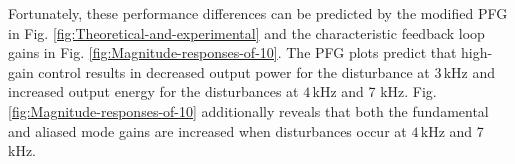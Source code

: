 \documentclass [11pt, proquest] {uwthesis}[2020/02/24]
\begin{document}
Fortunately, these performance differences can be predicted by the
modified PFG in Fig. \ref{fig:Theoretical-and-experimental} and the
characteristic feedback loop gains in Fig. \ref{fig:Magnitude-responses-of-10}.
The PFG plots predict that high-gain control results in decreased
output power for the disturbance at $3\,\text{kHz}$ and increased
output energy for the disturbances at $4\,\text{kHz}$ and 7 kHz.
Fig. \ref{fig:Magnitude-responses-of-10} additionally reveals that both
the fundamental and aliased mode gains are increased when disturbances
occur at $4\,\text{kHz}$ and 7 kHz.
\begin{figure}[!ht]
\begin{centering}
\par\end{centering}
\begin{centering}
\end{centering}
\end{figure}
\end{document}
